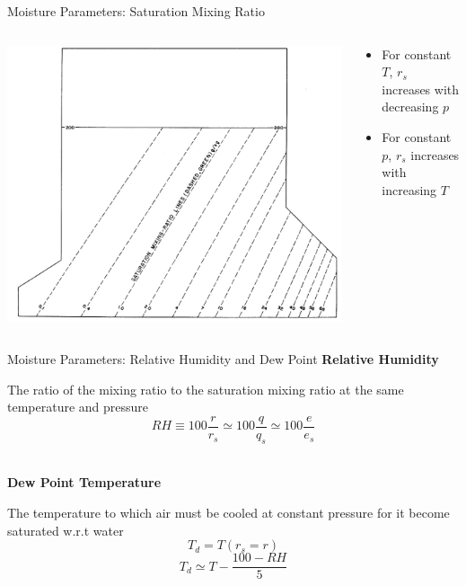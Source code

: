 \begin{frame}{Moisture Parameters: Saturation Mixing Ratio}
\begin{columns}[T]
    \begin{column}{.68\textwidth}
    \begin{minipage}[c][0.9\textheight][c]{\linewidth}
    \includegraphics[width=1\textwidth]{fig3}\\
    \end{minipage}
    \end{column}
    \begin{column}{.32\textwidth}
    \begin{minipage}[c][0.8\textheight][c]{\linewidth}
   \begin{itemize}
   	\item For constant $T$, $r_s$ increases with decreasing $p$
   	\item For constant $p$, $r_s$ increases with increasing $T$
   \end{itemize}
      \end{minipage}
    \end{column}
  \end{columns}
\end{frame}


\begin{frame}{Moisture Parameters: Relative Humidity and Dew Point}
\textbf{Relative Humidity}
\begin{fancydefs}
	The ratio of the mixing ratio to the saturation mixing ratio at the same temperature and pressure
	$$RH \equiv 100\frac{r}{r_s}\simeq100\frac{q}{q_s}\simeq100\frac{e}{e_s}$$
\end{fancydefs}
~\\
\textbf{Dew Point Temperature}
\begin{fancydefs}
	The temperature to which air must be cooled at constant pressure for it become saturated w.r.t water
	$$T_d = T(r_s = r)$$
	$$T_d \simeq T-\frac{100-RH}{5}$$
\end{fancydefs}
\end{frame}

